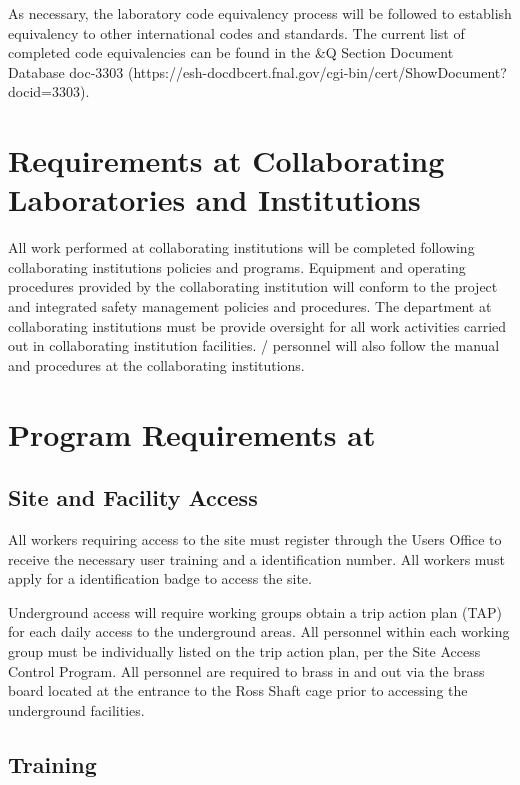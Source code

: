 As necessary, the laboratory code equivalency process will be followed
to establish equivalency to other international codes and
standards. The current list of completed code equivalencies can be
found in the \&Q Section Document Database doc-3303
(https://esh-docdbcert.fnal.gov/cgi-bin/cert/ShowDocument?docid=3303).


\section{ Requirements at Collaborating Laboratories and Institutions}

All work performed at collaborating institutions will be completed
following collaborating institutions  policies and
programs. Equipment and operating procedures provided by the
collaborating institution will conform to the  project
 and integrated safety management policies and
procedures. The  department at collaborating institutions
must be provide  oversight for all work activities carried
out in collaborating institution facilities. /
personnel will also follow the  manual and procedures at
the collaborating institutions.

\section{  Program Requirements at \surf}

\subsection{Site and Facility Access}

All  workers requiring access to the \surf site must
register through the \fnal Users Office to receive the necessary user
training and a \fnal identification number. All workers must apply for
a \surf identiﬁcation badge to access the \surf site.

\surf Underground access will require working groups obtain a trip
action plan (TAP) for each daily access to the underground areas.  All
personnel within each working group must be individually listed on the
trip action plan, per the \surf Site Access Control Program. All
personnel are required to brass in and out via the brass board
located at the entrance to the Ross Shaft cage prior to accessing the
underground facilities.

\subsection{ Training}


